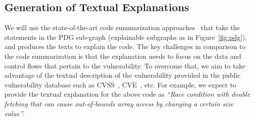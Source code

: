 \subsection{Generation of Textual Explanations}
\label{sec:tex}

We will use the state-of-the-art code summarization
approaches~\cite{shi-etal-2021-cast,chai2022pyramid} that take the
statements in the PDG sub-graph (explainable subgraphs as in
Figure~\ref{fig:pdg}), and produces the texts to explain the code. The
key challenges in comparison to the code summarization is that the
explanation needs to focus on the data and control flows that pertain
to the vulnerability. To overcome that, we aim to take advantage of
the textual description of the vulnerability provided in the public
vulnerability database such as CVSS~\cite{first-website},
CVE~\cite{cve}, etc. For example, we expect to provide the textual
explanation for the above code as {\em ``Race condition with double
  fetching that can cause out-of-bounds array access by changing a
  certain size value''}.

